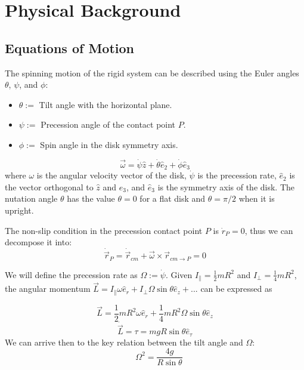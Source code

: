 \section{Physical Background}

\subsection{Equations of Motion}

The spinning motion of the rigid system can be described using the Euler angles $\theta$, $\psi$, and $\phi$:
\begin{itemize}
    \item $\theta:=$ Tilt angle with the horizontal plane.
    \item $\psi:=$ Precession angle of the contact point $P$.
    \item $\phi:=$ Spin angle in the disk symmetry axis.
\end{itemize}
\begin{equation}
    \vec\omega = \dot\psi\hat{z}+\dot\theta\hat{e}_{2}+\dot\phi\hat{e}_{3}
\end{equation}
where $\omega$ is the angular velocity vector of the disk, $\dot\psi$ is the precession rate, $\hat{e}_{2}$ is the vector orthogonal to $\hat{z}$ and $\hat{e}_{3}$, and $\hat{e}_{3}$ is the symmetry axis of the disk. The nutation angle $\theta$ has the value $\theta=0$ for a flat disk and $\theta=\pi/2$ when it is upright. 

The non-slip condition in the precession contact point $P$ is $\dot r_{P}=0$, thus we can decompose it into:
\begin{equation}
    \dot{\vec{r}}_{P}=\dot{\vec{r}}_{cm}+\vec{\omega}\times\vec{r}_{cm\rightarrow P}=0
\end{equation}

We will define the precession rate as $\Omega:=\dot\psi$.
Given $I_{\parallel}=\frac{1}{2}mR^2$ and $I_{\perp}=\frac{1}{4}mR^2$, the angular momentum $\vec L=I_{\parallel}\omega\hat e_r + I_{\perp}\Omega\sin\theta\hat e_z + ...$ can be expressed as

\begin{equation}
    \vec L=\frac{1}{2}mR^2\omega\hat e_r + \frac{1}{4}mR^2\Omega\sin\theta\hat e_z
\end{equation}
\begin{equation}
    \dot{\vec L}=\tau=mgR\sin\theta\hat e_{\tau}
\end{equation}
We can arrive then to the key relation between the tilt angle and $\Omega$:
\begin{equation}
    \quad \Omega^2=\frac{4g}{R\sin\theta}
\end{equation}

